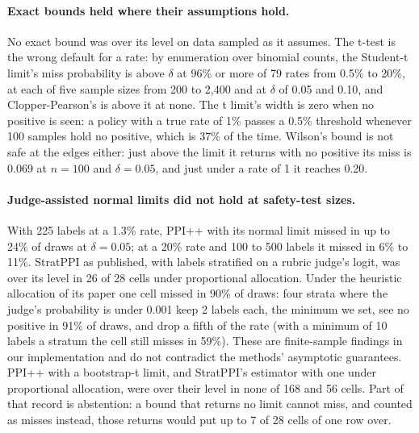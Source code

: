 \documentclass[letterpaper]{article} %
\begin{document}
\paragraph{Exact bounds held where their assumptions hold.} No exact bound was over its level on data sampled as it
assumes. The t-test is the wrong default for a rate: by enumeration over binomial counts, the Student-t limit's miss
probability is above $\delta$ at 96\% or more of 79 rates from 0.5\% to 20\%, at each of five sample sizes from 200 to
2,400 and at $\delta$ of 0.05 and 0.10, and Clopper-Pearson's is above it at none. The t limit's width is zero when no positive
is seen: a policy with a true rate of 1\% passes a 0.5\% threshold whenever 100 samples hold no positive, which is 37\%
of the time. Wilson's bound is not safe at the edges either: just above the limit it returns with no positive its miss
is 0.069 at $n=100$ and $\delta=0.05$, and just under a rate of 1 it reaches 0.20.

\paragraph{Judge-assisted normal limits did not hold at safety-test sizes.} With 225 labels at a 1.3\% rate, PPI++
with its normal limit missed in up to 24\% of draws at $\delta=0.05$; at a 20\% rate and 100 to 500 labels it missed in
6\% to 11\%. StratPPI as published, with labels stratified on a rubric judge's logit, was over its level in 26 of 28
cells under proportional allocation. Under the heuristic allocation of its paper one cell missed in 90\% of draws:
four strata where the judge's probability is under 0.001 keep 2 labels each, the minimum we set, see no positive in
91\% of draws, and drop a fifth of the rate (with a minimum of 10 labels a stratum the cell still misses in 59\%). These
are finite-sample findings in our implementation and do not contradict the methods' asymptotic guarantees. PPI++ with
a bootstrap-t limit, and StratPPI's estimator with one under proportional allocation, were over their level in none of
168 and 56 cells.
Part of that record is abstention: a bound that returns no limit cannot miss, and counted as misses instead, those
returns would put up to 7 of 28 cells of one row over.
\end{document}
